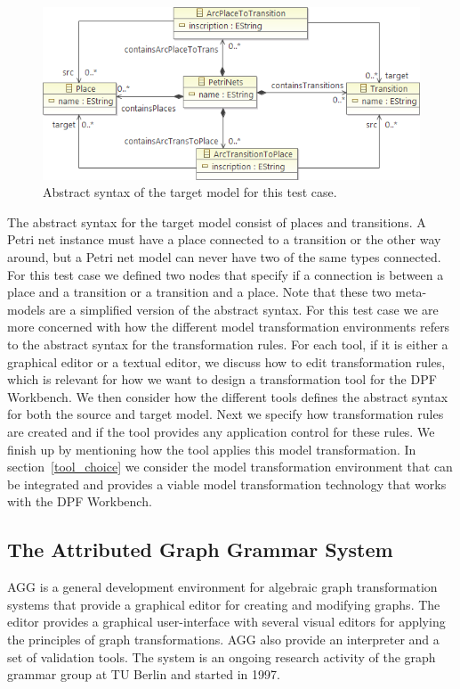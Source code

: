\begin{figure}[H]
	\centering
	\includegraphics[scale=0.7]{./Figures/PetriNetsMetamodel.png}
	\caption[Abstract syntax of the target model]
	{Abstract syntax of the target model for this test case.}
	\label{fig:petrinet_metamodel}
\end{figure}

The abstract syntax for the target model consist of places and transitions. A
Petri net instance must have a place connected to a transition or the other way
around, but a Petri net model can never have two of the same types connected.
For this test case we defined two nodes that specify if a connection is between
a place and a transition or a transition and a place. Note that these two
meta-models are a simplified version of the abstract syntax. For this test case
we are more concerned with how the different model transformation environments
refers to the abstract syntax for the transformation rules. For each tool, if it
is either a graphical editor or a textual editor, we discuss how to edit
transformation rules, which is relevant for how we want to design a
transformation tool for the DPF Workbench. We then consider how the different
tools defines the abstract syntax for both the source and target model. Next we
specify how transformation rules are created and if the tool provides any
application control for these rules. We finish up by mentioning how the tool
applies this model transformation. In section~\ref{tool_choice} we consider the
model transformation environment that can be integrated and provides a viable
model transformation technology that works with the DPF Workbench.

\subsection{The Attributed Graph Grammar System}

AGG is a general development environment for algebraic graph
transformation systems that provide a graphical editor for creating
and modifying graphs. The editor provides a graphical user-interface with
several visual editors for applying the principles of graph transformations. AGG
also provide an interpreter and a set of validation tools. The system is an
ongoing research activity of the graph grammar group at TU Berlin and started
in 1997.

